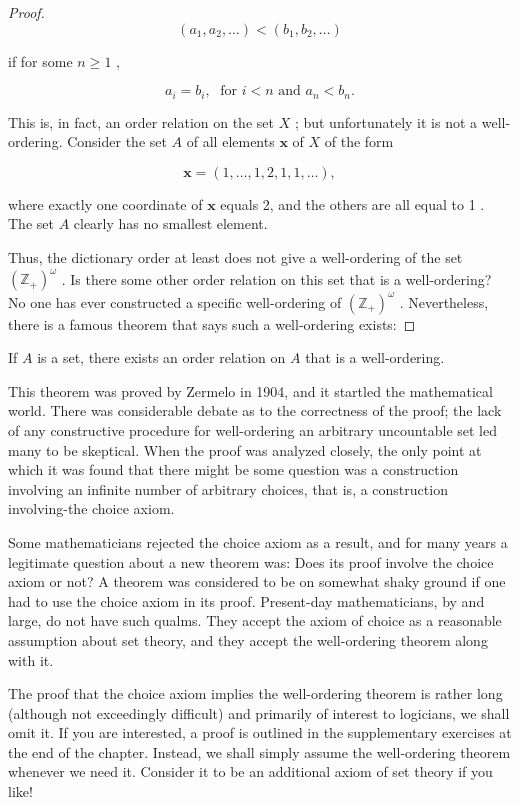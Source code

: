 \begin{proof}
\[
\left( {{a}_{1},{a}_{2},\ldots }\right)  < \left( {{b}_{1},{b}_{2},\ldots }\right)
\]

if for some \(n \geq  1\) ,

\[
{a}_{i} = {b}_{i},\;\text{ for }i < n\text{ and }{a}_{n} < {b}_{n}.
\]

This is, in fact, an order relation on the set \(X\) ; but unfortunately it is not a well-ordering. Consider the set \(A\) of all elements \(\mathbf{x}\) of \(X\) of the form

\[
\mathbf{x} = \left( {1,\ldots ,1,2,1,1,\ldots }\right) ,
\]

where exactly one coordinate of \(\mathbf{x}\) equals 2, and the others are all equal to 1 . The set \(A\) clearly has no smallest element.

Thus, the dictionary order at least does not give a well-ordering of the set \({\left( {\mathbb{Z}}_{ + }\right) }^{\omega }\) . Is there some other order relation on this set that is a well-ordering? No one has ever constructed a specific well-ordering of \({\left( {\mathbb{Z}}_{ + }\right) }^{\omega }\) . Nevertheless, there is a famous theorem that says such a well-ordering exists:
\end{proof}
\begin{theorem} If \(A\) is a set, there exists an order relation on \(A\) that is a well-ordering.
\end{theorem}

This theorem was proved by Zermelo in 1904, and it startled the mathematical world. There was considerable debate as to the correctness of the proof; the lack of any constructive procedure for well-ordering an arbitrary uncountable set led many to be skeptical. When the proof was analyzed closely, the only point at which it was found that there might be some question was a construction involving an infinite number of arbitrary choices, that is, a construction involving-the choice axiom.

Some mathematicians rejected the choice axiom as a result, and for many years a legitimate question about a new theorem was: Does its proof involve the choice axiom or not? A theorem was considered to be on somewhat shaky ground if one had to use the choice axiom in its proof. Present-day mathematicians, by and large, do not have such qualms. They accept the axiom of choice as a reasonable assumption about set theory, and they accept the well-ordering theorem along with it.

The proof that the choice axiom implies the well-ordering theorem is rather long (although not exceedingly difficult) and primarily of interest to logicians, we shall omit it. If you are interested, a proof is outlined in the supplementary exercises at the end of the chapter. Instead, we shall simply assume the well-ordering theorem whenever we need it. Consider it to be an additional axiom of set theory if you like!

